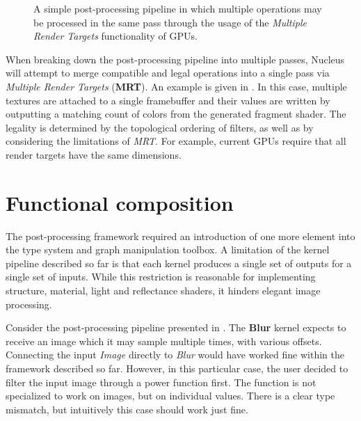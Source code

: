 \begin{figure}[ht!]
  \centering
    \caption[MRT usage in post-processing]{A simple post-processing pipeline in which multiple operations may be processed in the same pass through the usage of the \emph{Multiple Render Targets} functionality of GPUs.}
  \label{fig:PostProcMRT}
\end{figure}

When breaking down the post-processing pipeline into multiple passes, Nucleus will attempt to merge compatible and legal operations into a single pass via \emph{Multiple Render Targets} (\textbf{MRT}). An example is given in . In this case, multiple textures are attached to a single framebuffer and their values are written by outputting a matching count of colors from the generated fragment shader. The legality is determined by the topological ordering of filters, as well as by considering the limitations of \emph{MRT}. For example, current GPUs require that all render targets have the same dimensions.


\section{Functional composition}
\label{sec:FunctionalComposition}

The post-processing framework required an introduction of one more element into the type system and graph manipulation toolbox. A limitation of the kernel pipeline described so far is that each kernel produces a single set of outputs for a single set of inputs. While this restriction is reasonable for implementing structure, material, light and reflectance shaders, it hinders elegant image processing.

Consider the post-processing pipeline presented in . The \textbf{Blur} kernel expects to receive an image which it may sample multiple times, with various offsets. Connecting the input \emph{Image} directly to \emph{Blur} would have worked fine within the framework described so far. However, in this particular case, the user decided to filter the input image through a power function first. The function is not specialized to work on images, but on individual values. There is a clear type mismatch, but intuitively this case should work just fine.

